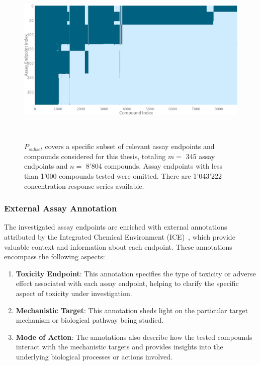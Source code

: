 \begin{figure}[h]
    \centering
    \includegraphics[width=1.0\textwidth]{figures/presence_matrix_subset.png}
    \caption{$P_{subset}$ covers a specific subset of relevant assay endpoints and compounds considered for this thesis, totaling $m =$ 345 assay endpoints and $n =$ 8'804 compounds. Assay endpoints with less than 1'000 compounds tested were omitted. There are 1'043'222 concentration-response series available.}
~\label{fig:presence_matrix_subset}
\end{figure}


\subsubsection{External Assay Annotation}
The investigated assay endpoints are enriched with external annotations attributed by the Integrated Chemical Environment (ICE)~\cite{ice2022}, which provide valuable context and information about each endpoint. These annotations encompass the following aspects:

\begin{enumerate}
    \item \textbf{Toxicity Endpoint}: This annotation specifies the type of toxicity or adverse effect associated with each assay endpoint, helping to clarify the specific aspect of toxicity under investigation.
    
    \item \textbf{Mechanistic Target}: This annotation sheds light on the particular target mechanism or biological pathway being studied.
    
    \item \textbf{Mode of Action}: The annotations also describe how the tested compounds interact with the mechanistic targets and provides insights into the underlying biological processes or actions involved.
\end{enumerate}

